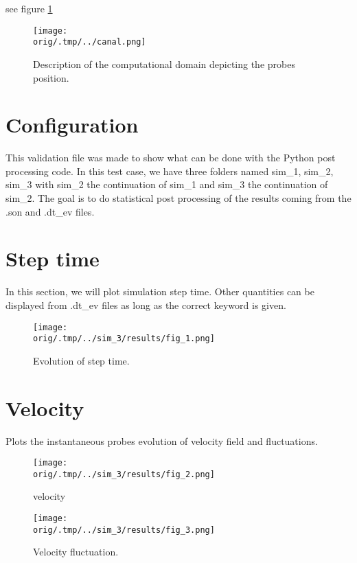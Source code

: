 

see figure \ref{domain}
\begin{figure}[h!]
\centering
\texttt{[image: \\orig/.tmp/../canal.png]}
\caption{Description of the computational domain depicting the probes position.}
\label{domain}
\end{figure}



\section{Configuration}

This validation file was made to show what can be done with the Python post processing code. In this test case, we have 
three folders named sim\_1, sim\_2, sim\_3 with sim\_2 the continuation of sim\_1 and sim\_3 the continuation of sim\_2. 
The goal is to do statistical post processing of the results coming from the .son and .dt\_ev files. \\


\newpage
\section{Step time}
In this section, we will plot simulation step time. Other quantities can be displayed from .dt\_ev files
as long as the correct keyword is given.


\begin{figure}[h!]
\centering
\texttt{[image: \\orig/.tmp/../sim\_3/results/fig\_1.png]}
\caption{Evolution of step time.}
\label{fig1}
\end{figure}

\newpage
\section{Velocity}
Plots the instantaneous probes evolution of velocity field and fluctuations.


\begin{figure}[h!]
\centering  
\texttt{[image: \\orig/.tmp/../sim\_3/results/fig\_2.png]}
\caption{velocity}
\label{fig2}
\end{figure}


\begin{figure}[h!]
\centering
\texttt{[image: \\orig/.tmp/../sim\_3/results/fig\_3.png]}
\caption{Velocity fluctuation.}
\label{fig3}
\end{figure}


